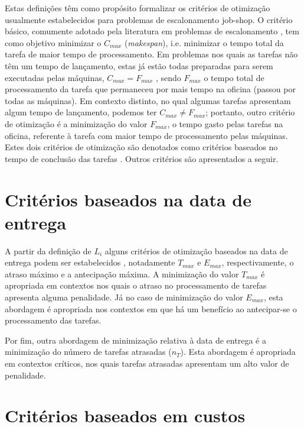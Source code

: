 \documentclass[relatorio,nocolorlinks]{inf-ufg}
\begin{document}
Estas defini\c{c}\~{o}es t\^{e}m como prop\'{o}sito formalizar os crit\'{e}rios de otimiza\c{c}\~{a}o usualmente estabelecidos para problemas de
escalonamento job-shop. O crit\'{e}rio b\'{a}sico, comumente adotado pela literatura em problemas de escalonamento \cite{Chen2011}, tem como objetivo
minimizar o $C_{max}$ (\textit{makespan}), i.e. minimizar o tempo total da tarefa de maior tempo de processamento. Em problemas nos quais as
tarefas n\~{a}o t\^{e}m um tempo de lan\c{c}amento, estas j\'{a} est\~{a}o todas preparadas para serem executadas pelas m\'{a}quinas,
$C_{max} = F_{max}$ , sendo $F_{max}$ o tempo total de processamento da tarefa que permaneceu por mais tempo na oficina (passou por todas as
m\'{a}quinas). Em contexto distinto, no qual algumas tarefas apresentam algum tempo de lan\c{c}amento, podemos ter $C_{max} \neq F_{max}$;
portanto, outro crit\'{e}rio de otimiza\c{c}\~{a}o \'{e} a minimiza\c{c}\~{a}o do valor $F_{max}$, o tempo gasto pelas tarefas na oficina,
referente \`{a} tarefa com maior tempo de processamento pelas m\'{a}quinas. Estes dois crit\'{e}rios de otimiza\c{c}\~{a}o s\~{a}o denotados
como crit\'{e}rios baseados no tempo de conclus\~{a}o das tarefas \cite{French1982}. Outros crit\'{e}rios s\~{a}o apresentados a seguir.

\section{Crit\'{e}rios baseados na data de entrega}

A partir da defini\c{c}\~{a}o de $L_{i}$ alguns crit\'{e}rios de otimiza\c{c}\~{a}o baseados na data de entrega podem ser estabelecidos
\cite{French1982}, notadamente $T_{max}$ e $E_{max}$, respectivamente, o atraso m\'{a}ximo e a antecipa\c{c}\~{a}o m\'{a}xima. A
minimiza\c{c}\~{a}o do valor $T_{max}$ \'{e} apropriada em contextos nos quais o atraso no processamento de tarefas apresenta alguma penalidade.
J\'{a} no caso de minimiza\c{c}\~{a}o do valor $E_{max}$, esta abordagem \'{e} apropriada nos contextos em que h\'{a} um benef\'{i}cio ao
antecipar-se o processamento das tarefas.

Por fim, outra abordagem de minimiza\c{c}\~{a}o relativa \`{a} data de entrega \'{e} a minimiza\c{c}\~{a}o do n\'{u}mero de tarefas atrasadas
($n_{T}$). Esta abordagem \'{e} apropriada em contextos cr\'{i}ticos, nos quais tarefas atrasadas apresentam um alto valor de penalidade.

\section{Crit\'{e}rios baseados em custos}
\end{document}
